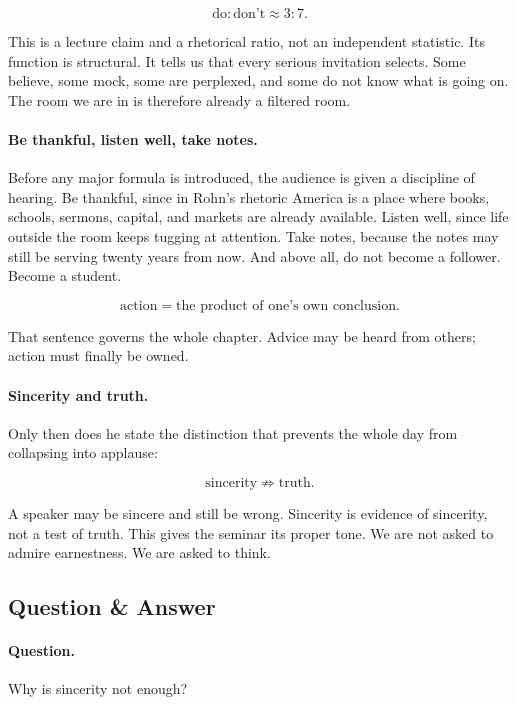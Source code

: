 \begin{equation}
\text{do}:\text{don't} \approx 3:7.
\end{equation}

This is a lecture claim and a rhetorical ratio, not an independent statistic. Its function is structural. It tells us that every serious invitation selects. Some believe, some mock, some are perplexed, and some do not know what is going on. The room we are in is therefore already a filtered room.

\paragraph{Be thankful, listen well, take notes.}
Before any major formula is introduced, the audience is given a discipline of hearing. Be thankful, since in Rohn's rhetoric America is a place where books, schools, sermons, capital, and markets are already available. Listen well, since life outside the room keeps tugging at attention. Take notes, because the notes may still be serving twenty years from now. And above all, do not become a follower. Become a student.

\begin{equation}
\text{action} = \text{the product of one's own conclusion}.
\end{equation}

That sentence governs the whole chapter. Advice may be heard from others; action must finally be owned.

\paragraph{Sincerity and truth.}
Only then does he state the distinction that prevents the whole day from collapsing into applause:

\begin{equation}
\text{sincerity} \not\Rightarrow \text{truth}.
\end{equation}

A speaker may be sincere and still be wrong. Sincerity is evidence of sincerity, not a test of truth. This gives the seminar its proper tone. We are not asked to admire earnestness. We are asked to think.

\subsection{Question \& Answer}

\paragraph{Question.}
Why is sincerity not enough?

